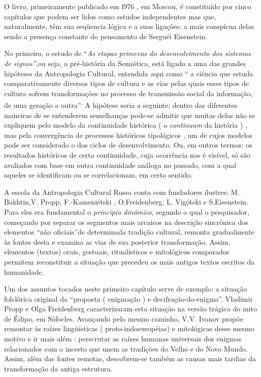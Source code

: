 O livro, primeiramente publicado em l976 , em Moscou, é constituído por
cinco capítulos que podem ser lidos como estudos independentes mas que,
naturalmente, têm sua seqüencia lógica e a suas ligações: a mais
conspícua delas sendo a presença constante do pensamento de Serguéi
Eisenstein.

No primeiro, o estudo de ``\emph{As etapas primevas do desenvolvimento
dos sistemas de signos'',}ou seja, a pré-história da Semiótica, está
ligado a uma das grandes hipóteses da Antropologia Cultural, entendida
aqui como `` a ciência que estuda comparativamente diversos tipos de
cultura e as vias pelas quais esses tipos de cultura sofrem
transformações no processo de transmissão social da informação, de uma
geração a outra''\textsuperscript{.} A hipótese seria a seguinte: dentro
das diferentes maneiras de se entenderem semelhanças pode-se admitir que
muitas delas não se expliquem pelo modelo da continuidade histórica ( o
\emph{continuum} da história ) , mas pela convergência de processos
históricos tipológicos , um de cujos modelos pode ser considerado o dos
ciclos de desenvolvimento. Ou, em outros termos: os resultados
históricos de certa continuidade, cuja ocorrência nos é visível, só são
avaliados com base em outra continuidade análoga no passado, com a qual
aqueles se identificam ou se correlacionam, em certo sentido.

A escola da Antropologia Cultural Russa conta com fundadores ilustres:
M. Bakhtin,V. Propp, F.-Kameniétski , O.Freidenberg, L. Vigótski e
S.Eisenstein. Para eles era fundamental o \emph{princípio dinâmico,}
segundo o qual o pesquisador, começando por separar os segmentos mais
arcaicos na descrição sincrônica dos elementos ``não oficiais''de
determinada tradição cultural, remonta gradualmente às fontes desta e
examina as vias de sua posterior transformação. Assim, elementos
(textos) orais, gestuais, ritualísticos e mitológicos comparados
permitem reconstituir a situação que precedeu os mais antigos textos
escritos da humanidade.

Um dos assuntos tocados neste primeiro capítulo serve de exemplo: a
situação folclórica original da ``proposta ( enigmação ) e
decifração-do-enigma''. Vladimir Propp e Olga Freidenberg caracterizaram
esta situação na versão trágica do mito de Édipo, em Sófocles. Avançando
pelo mesmo caminho, V.V. Ivanov propõe remontar às raízes lingüísticas (
proto-indoeuropéias) e mitológicas desse mesmo motivo e ir mais além :
perscrutar as raízes humanas universais dos enigmas relacionados com o
incesto que unem as tradições do Velho e do Novo Mundo. Assim, além das
fontes remotas, descobrem-se também as causas mais tardias da
transformação da antiga estrutura.

